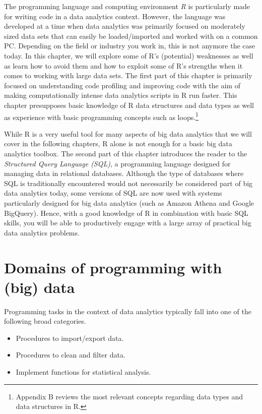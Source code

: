 \documentclass[
  12pt,
]{style/krantz}
\providecommand{\tightlist}{%
  \setlength{\itemsep}{0pt}\setlength{\parskip}{0pt}}
\begin{document}
The programming language and computing environment \emph{R} is particularly made for writing code in a data analytics context. However, the language was developed at a time when data analytics was primarily focused on moderately sized data sets that can easily be loaded/imported and worked with on a common PC. Depending on the field or industry you work in, this is not anymore the case today. In this chapter, we will explore some of R's (potential) weaknesses as well as learn how to avoid them and how to exploit some of R's strengths when it comes to working with large data sets. The first part of this chapter is primarily focused on understanding code profiling and improving code with the aim of making computationally intense data analytics scripts in R run faster. This chapter presupposes basic knowledge of R data structures and data types as well as experience with basic programming concepts such as loops.\footnote{Appendix B reviews the most relevant concepts regarding data types and data structures in R.}

While R is a very useful tool for many aspects of big data analytics that we will cover in the following chapters, R alone is not enough for a basic big data analytics toolbox. The second part of this chapter introduces the reader to the \emph{Structured Query Language (SQL)}, a programming language designed for managing data in relational databases. Although the type of databases where SQL is traditionally encountered would not necessarily be considered part of big data analytics today, some versions of SQL are now used with systems particularly designed for big data analytics (such as Amazon Athena and Google BigQuery). Hence, with a good knowledge of R in combination with basic SQL skills, you will be able to productively engage with a large array of practical big data analytics problems.

\hypertarget{domains-of-programming-with-big-data}{%
\section{Domains of programming with (big) data}\label{domains-of-programming-with-big-data}}

Programming tasks in the context of data analytics typically fall into one of the following broad categories.

\begin{itemize}
\tightlist
\item
  Procedures to import/export data.
\item
  Procedures to clean and filter data.
\item
  Implement functions for statistical analysis.
\end{itemize}
\end{document}
